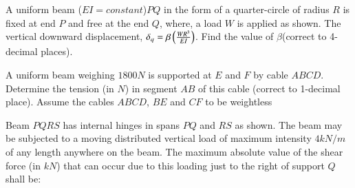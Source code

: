 \documentclass[journal]{IEEEtran}
\begin{document}
\begin{enumerate}
{	%
	\begin{figure}[H]
    		\centering
    		
    		\caption{}
    		\label{36}
	\end{figure}
	
	\item
	A uniform beam ($EI = constant$)$PQ$ in the form of a quarter-circle of radius $R$ is fixed at end $P$ and free at the end $Q$, where, a load $W$ is applied as shown. The vertical downward displacement, $\delta_{q} = \beta\left(\frac{W R^{3}}{EI}\right)$. Find the value of $\beta$(correct to 4-decimal places).
	
	\begin{figure}[H]
    		\centering
    		
    		\caption{}
    		\label{36}
	\end{figure}

	
	\item
	A uniform beam weighing $1800 N$ is supported at $E$ and $F$ by cable $ABCD$. Determine the tension (in $N$) in segment $AB$ of this cable (correct to 1-decimal place). Assume the cables $ABCD$, $BE$ and $CF$ to be weightless
	
	\begin{figure}[H]
    		\centering
    		
    		\caption{}
    		\label{36}
	\end{figure}

	
	\item
	Beam $PQRS$ has internal hinges in spans $PQ$ and $RS$ as shown. The beam may be subjected to a moving distributed vertical load of maximum intensity $4 kN/m$ of any length anywhere on the beam. The maximum absolute value of the shear force (in $kN$) that can occur due to this loading just to the right of support $Q$ shall be:
	\begin{figure}[H]
    		\centering
    		
    		\caption{}
    		\label{36}
	\end{figure}

}
\end{enumerate}
\end{document}

